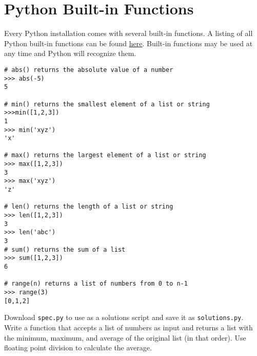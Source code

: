 \label{lab:Standard Library}

\section*{Python Built-in Functions}

Every Python installation comes with several built-in functions.
A listing of all Python built-in functions can be found \href{https://docs.python.org/2/library/functions.html}{here}.
Built-in functions may be used at any time and Python will recognize them.

\begin{lstlisting}
# abs() returns the absolute value of a number
>>> abs(-5)
5

# min() returns the smallest element of a list or string
>>>min([1,2,3])
1
>>> min('xyz')
'x'

# max() returns the largest element of a list or string
>>> max([1,2,3])
3
>>> max('xyz')
'z'

# len() returns the length of a list or string
>>> len([1,2,3])
3
>>> len('abc')
3
# sum() returns the sum of a list
>>> sum([1,2,3])
6

# range(n) returns a list of numbers from 0 to n-1
>>> range(3)
[0,1,2]
\end{lstlisting}

\begin{problem}
Download \texttt{spec.py} to use as a solutions script and save it as \texttt{solutions.py}.
Write a function that accepts a list of numbers as input and returns a list with the minimum, maximum, and average of the original list (in that order).
Use floating point division to calculate the average.
\end{problem}

